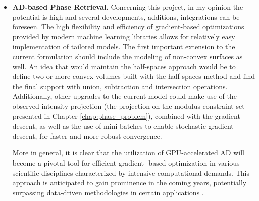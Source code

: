 \begin{itemize}
    \item \textbf{AD-based Phase Retrieval.} Concerning this project, in my opinion the potential is high and several 
    developments, additions, integrations can be foreseen. The high flexibility and efficiency of gradient-based 
    optimizations provided by modern machine learning libraries allows for relatively easy implementation of tailored 
    models. The first important extension to the current formulation should include the modeling of non-convex surfaces 
    as well. An idea that would maintain the half-spaces approach would be to define two or more convex volumes built 
    with the half-spaces method and find the final support with union, subtraction and intersection operations. 
    Additionally, other upgrades to the current model could make use of the observed intensity projection 
    (the projection on the modulus constraint set presented in Chapter \ref{chap:phase_problem}), combined with the 
    gradient descent, as well as the use of mini-batches to enable stochastic gradient descent, 
    for faster and more robust convergence. 
    
    More in general, it is clear that the utilization of GPU-accelerated AD will become a pivotal tool for efficient gradient-
    based optimization in various scientific disciplines characterized by intensive computational demands. This approach 
    is anticipated to gain prominence in the coming years, potentially surpassing data-driven methodologies in certain 
    applications \cite{baydin2018,STIERLE2024120380, 10487099}.

\end{itemize}

